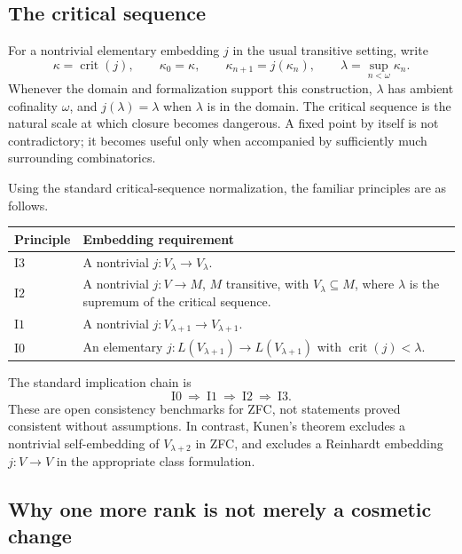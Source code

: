 \documentclass[11pt,letterpaper]{article}
\theoremstyle{definition}
\newcommand{\crit}{\operatorname{crit}}
\newcommand{\Izero}{\mathrm{I0}}
\newcommand{\Ione}{\mathrm{I1}}
\newcommand{\Itwo}{\mathrm{I2}}
\newcommand{\Ithree}{\mathrm{I3}}
\begin{document}
\subsection{The critical sequence}

For a nontrivial elementary embedding $j$ in the usual transitive setting, write
\[
 \kappa=\crit(j),\qquad \kappa_0=\kappa,\qquad
 \kappa_{n+1}=j(\kappa_n),\qquad
 \lambda=\sup_{n<\omega}\kappa_n.
\]
Whenever the domain and formalization support this construction, $\lambda$ has ambient cofinality $\omega$, and $j(\lambda)=\lambda$ when $\lambda$ is in the domain. The critical sequence is the natural scale at which closure becomes dangerous. A fixed point by itself is not contradictory; it becomes useful only when accompanied by sufficiently much surrounding combinatorics.

Using the standard critical-sequence normalization, the familiar principles are as follows. \cite{dimonte}

\begin{center}
\renewcommand{\arraystretch}{1.16}
\begin{tabularx}{\textwidth}{@{}lY@{}}
\toprule
\textbf{Principle}&\textbf{Embedding requirement}\\\midrule
$\Ithree$ & A nontrivial $j:V_\lambda\to V_\lambda$.\\
$\Itwo$ & A nontrivial $j:V\to M$, $M$ transitive, with $V_\lambda\subseteq M$, where $\lambda$ is the supremum of the critical sequence.\\
$\Ione$ & A nontrivial $j:V_{\lambda+1}\to V_{\lambda+1}$.\\
$\Izero$ & An elementary $j:L(V_{\lambda+1})\to L(V_{\lambda+1})$ with $\crit(j)<\lambda$.\\
\bottomrule
\end{tabularx}
\end{center}

The standard implication chain is
\[
 \Izero\ \Longrightarrow\ \Ione\ \Longrightarrow\ \Itwo\ \Longrightarrow\ \Ithree.
\]
These are open consistency benchmarks for ZFC, not statements proved consistent without assumptions. In contrast, Kunen's theorem excludes a nontrivial self-embedding of $V_{\lambda+2}$ in ZFC, and excludes a Reinhardt embedding $j:V\to V$ in the appropriate class formulation. \cite{kunen,hkp,dimonte}

\subsection{Why one more rank is not merely a cosmetic change}
\end{document}

